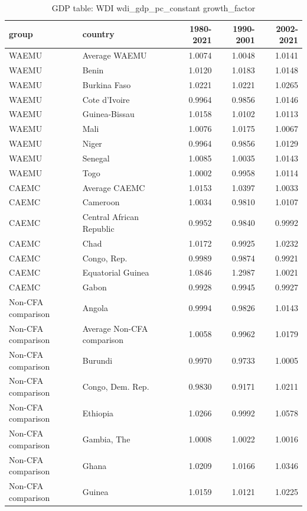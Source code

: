 \begin{table}

\caption{GDP table: WDI wdi_gdp_pc_constant growth_factor}
\centering
\begin{tabular}[t]{llrrr}
\toprule
group & country & 1980-2021 & 1990-2001 & 2002-2021\\
\midrule
WAEMU & Average WAEMU & 1.0074 & 1.0048 & 1.0141\\
WAEMU & Benin & 1.0120 & 1.0183 & 1.0148\\
WAEMU & Burkina Faso & 1.0221 & 1.0221 & 1.0265\\
WAEMU & Cote d'Ivoire & 0.9964 & 0.9856 & 1.0146\\
WAEMU & Guinea-Bissau & 1.0158 & 1.0102 & 1.0113\\
\addlinespace
WAEMU & Mali & 1.0076 & 1.0175 & 1.0067\\
WAEMU & Niger & 0.9964 & 0.9856 & 1.0129\\
WAEMU & Senegal & 1.0085 & 1.0035 & 1.0143\\
WAEMU & Togo & 1.0002 & 0.9958 & 1.0114\\
CAEMC & Average CAEMC & 1.0153 & 1.0397 & 1.0033\\
\addlinespace
CAEMC & Cameroon & 1.0034 & 0.9810 & 1.0107\\
CAEMC & Central African Republic & 0.9952 & 0.9840 & 0.9992\\
CAEMC & Chad & 1.0172 & 0.9925 & 1.0232\\
CAEMC & Congo, Rep. & 0.9989 & 0.9874 & 0.9921\\
CAEMC & Equatorial Guinea & 1.0846 & 1.2987 & 1.0021\\
\addlinespace
CAEMC & Gabon & 0.9928 & 0.9945 & 0.9927\\
Non-CFA comparison & Angola & 0.9994 & 0.9826 & 1.0143\\
Non-CFA comparison & Average Non-CFA comparison & 1.0058 & 0.9962 & 1.0179\\
Non-CFA comparison & Burundi & 0.9970 & 0.9733 & 1.0005\\
Non-CFA comparison & Congo, Dem. Rep. & 0.9830 & 0.9171 & 1.0211\\
\addlinespace
Non-CFA comparison & Ethiopia & 1.0266 & 0.9992 & 1.0578\\
Non-CFA comparison & Gambia, The & 1.0008 & 1.0022 & 1.0016\\
Non-CFA comparison & Ghana & 1.0209 & 1.0166 & 1.0346\\
Non-CFA comparison & Guinea & 1.0159 & 1.0121 & 1.0225\\

\end{tabular}
\end{table}
